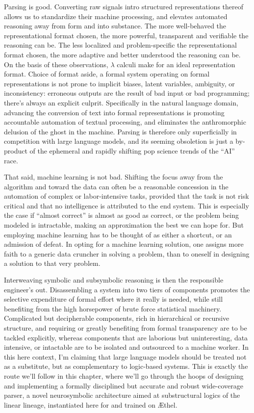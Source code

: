 Parsing is good.
Converting raw signals intro structured representations thereof allows us to standardize their machine processing, and elevates automated reasoning away from form and into substance.
The more well-behaved the representational format chosen, the more powerful, transparent and verifiable the reasoning can be.
The less localized and problem-specific the representational format chosen, the more adaptive and better understood the reasoning can be.
On the basis of these observations, $\lambda$ calculi make for an ideal representation format.
Choice of format aside, a formal system operating on formal representations is not prone to implicit biases, latent variables, ambiguity, or inconsistency: erroneous outputs are the result of bad input or bad programming; there's always an explicit culprit.
Specifically in the natural language domain, advancing the conversion of text into formal representations is promoting accountable automation of textual processing, and eliminates the anthromorphic delusion of the ghost in the machine.
Parsing is therefore only superficially in competition with large language models, and its seeming obsoletion is just a by-product of the ephemeral and rapidly shifting pop science trends of the ``AI'' race.

That said, machine learning is not bad.
Shifting the focus away from the algorithm and toward the data can often be a reasonable concession in the automation of complex or labor-intensive tasks, provided that the task is not risk critical and that no intelligence is attributed to the end system.
This is especially the case if ``almost correct'' is almost as good as correct, or the problem being modeled is intractable, making an approximation the best we can hope for.
But employing machine learning has to be thought of as either a shortcut, or an admission of defeat.
In opting for a machine learning solution, one assigns more faith to a generic data cruncher in solving a problem, than to oneself in designing a solution to that very problem.

Interweaving symbolic and subsymbolic reasoning is then the responsible engineer's out.
Disassembling a system into two tiers of components promotes the selective expenditure of formal effort where it really is needed, while still benefiting from the  high horsepower of brute force statistical machinery.
Complicated but decipherable components, rich in hierarchical or recursive structure, and requiring or greatly benefiting from formal transparency are to be tackled explicitly, whereas components that are laborious but uninteresting, data intensive, or intactable are to be isolated and outsourced to a machine worker.
In this here context, I'm claiming that large language models should be treated not as a substitute, but as complementary to logic-based systems.
This is exactly the route we'll follow in this chapter, where we'll go through the hoops of designing and implementing a formally disciplined but accurate and robust wide-coverage parser, a novel neurosymbolic architecture aimed at substructural logics of the linear lineage, instantiated here for \NLPplus{} and trained on \AE thel.

